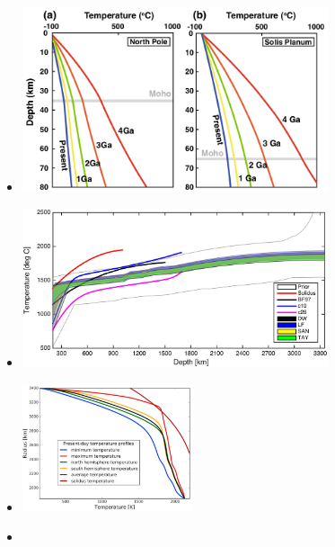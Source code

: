 \begin{itemize}
\item {}

\begin{center}
\includegraphics[width=9cm]{images/mars/temperature/azka17}
\end{center}

\item {}

\begin{center}
\includegraphics[width=9cm]{images/mars/temperature/khlr18}
\end{center}

\item {}

\begin{center}
\includegraphics[width=5cm]{images/mars/temperature/plpt18}
\end{center}

\item {}


\end{itemize}
